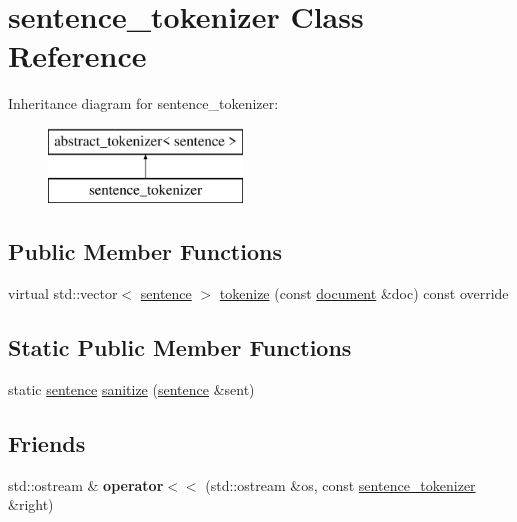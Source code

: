 \hypertarget{classsentence__tokenizer}{}\section{sentence\+\_\+tokenizer Class Reference}
\label{classsentence__tokenizer}
Inheritance diagram for sentence\+\_\+tokenizer\+:\begin{figure}[H]
\begin{center}
\leavevmode
\includegraphics[height=2.000000cm]{classsentence__tokenizer}
\end{center}
\end{figure}
\subsection*{Public Member Functions}
\begin{DoxyCompactItemize}
\item 
virtual std\+::vector$<$ \hyperlink{classsentence}{sentence} $>$ \hyperlink{classsentence__tokenizer_a7d8d0af4624c8bc7d37dd85af99f5695}{tokenize} (const \hyperlink{classdocument}{document} \&doc) const override
\end{DoxyCompactItemize}
\subsection*{Static Public Member Functions}
\begin{DoxyCompactItemize}
\item 
static \hyperlink{classsentence}{sentence} \hyperlink{classsentence__tokenizer_a9e0f69df43e0a28ff849628274bc7990}{sanitize} (\hyperlink{classsentence}{sentence} \&sent)
\end{DoxyCompactItemize}
\subsection*{Friends}
\begin{DoxyCompactItemize}
\item 
\mbox{\label{classsentence__tokenizer_a117c39aafe92e99e106009e113640bc5}} 
std\+::ostream \& {\bfseries operator$<$$<$} (std\+::ostream \&os, const \hyperlink{classsentence__tokenizer}{sentence\+\_\+tokenizer} \&right)
\end{DoxyCompactItemize}


